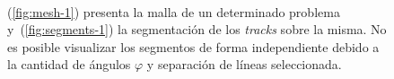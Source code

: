 \documentclass[11pt]{article}
\numberwithin{equation}{section}
\begin{document}
\begin{figure}[!h]
 \begin{center}
  \\
  \caption{(\ref{fig:mesh-1}) presenta la malla de un determinado problema y~(\ref{fig:segments-1}) la segmentación de los \emph{tracks} sobre la misma. No es posible visualizar los segmentos de forma independiente debido a la cantidad de ángulos $\varphi$ y separación de líneas seleccionada.}
  \label{fig:mesh-and-segments-1}
 \end{center}
\end{figure}
\end{document}
